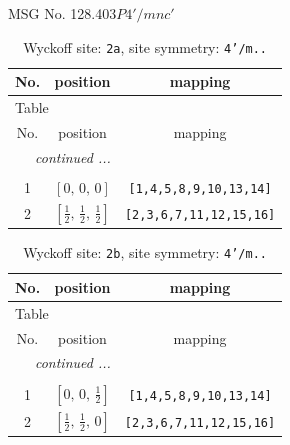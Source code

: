 \documentclass[fleqn,8pt]{jsarticle}
\begin{document}
\setcounter{MaxMatrixCols}{32}

\renewcommand{\tablename}{Table~}
\renewcommand{\figurename}{Figure~}
\begin{center}
\LARGE
MSG No. 128.403\quad$P4'/mnc'$
\end{center}
\renewcommand{\arraystretch}{1.2}
\begin{longtable}{ccc}
\caption{Wyckoff site: {\tt 2a}, site symmetry: {\tt 4'/m..}}
 \\
 \hline \hline
No. & position & mapping \\ \hline \endfirsthead

\multicolumn{2}{l}{\tablename\ \thetable{}} \\
 \hline \hline
No. & position & mapping \\ \hline \endhead

 \hline \hline
\multicolumn{2}{r}{\footnotesize\it continued ...} \\ \endfoot

 \hline \hline
\multicolumn{2}{r}{} \\ \endlastfoot

1 & $\left[ 0,\, 0,\, 0 \right]$ & {\tt [1,4,5,8,9,10,13,14]} \\ \hline
2 & $\left[ \frac{1}{2},\, \frac{1}{2},\, \frac{1}{2} \right]$ & {\tt [2,3,6,7,11,12,15,16]} \\
\end{longtable}
\renewcommand{\arraystretch}{1.2}
\begin{longtable}{ccc}
\caption{Wyckoff site: {\tt 2b}, site symmetry: {\tt 4'/m..}}
 \\
 \hline \hline
No. & position & mapping \\ \hline \endfirsthead

\multicolumn{2}{l}{\tablename\ \thetable{}} \\
 \hline \hline
No. & position & mapping \\ \hline \endhead

 \hline \hline
\multicolumn{2}{r}{\footnotesize\it continued ...} \\ \endfoot

 \hline \hline
\multicolumn{2}{r}{} \\ \endlastfoot

1 & $\left[ 0,\, 0,\, \frac{1}{2} \right]$ & {\tt [1,4,5,8,9,10,13,14]} \\ \hline
2 & $\left[ \frac{1}{2},\, \frac{1}{2},\, 0 \right]$ & {\tt [2,3,6,7,11,12,15,16]} \\
\end{longtable}
\end{document}
